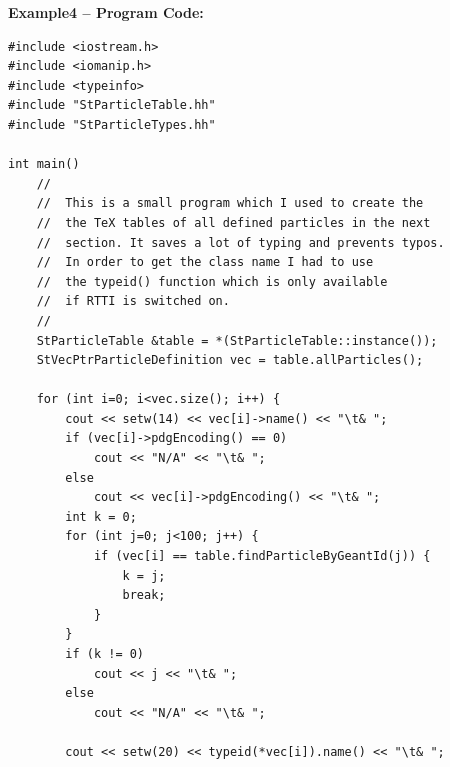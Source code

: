 \documentclass[twoside]{article}
\begin{document}
\begin{description}
{{\bf Example4 -- Program Code:}  
\begin{verbatim}
#include <iostream.h>
#include <iomanip.h>
#include <typeinfo>
#include "StParticleTable.hh"
#include "StParticleTypes.hh"

int main()
    //
    //  This is a small program which I used to create the
    //  the TeX tables of all defined particles in the next
    //  section. It saves a lot of typing and prevents typos.
    //  In order to get the class name I had to use
    //  the typeid() function which is only available
    //  if RTTI is switched on. 
    // 
    StParticleTable &table = *(StParticleTable::instance());
    StVecPtrParticleDefinition vec = table.allParticles();

    for (int i=0; i<vec.size(); i++) {
        cout << setw(14) << vec[i]->name() << "\t& ";
        if (vec[i]->pdgEncoding() == 0)
            cout << "N/A" << "\t& ";
        else
            cout << vec[i]->pdgEncoding() << "\t& ";
        int k = 0;
        for (int j=0; j<100; j++) {
            if (vec[i] == table.findParticleByGeantId(j)) {
                k = j;
                break;
            }
        }
        if (k != 0) 
            cout << j << "\t& ";
        else
            cout << "N/A" << "\t& ";

        cout << setw(20) << typeid(*vec[i]).name() << "\t& ";


\end{verbatim}}
\end{description}
\end{document}
